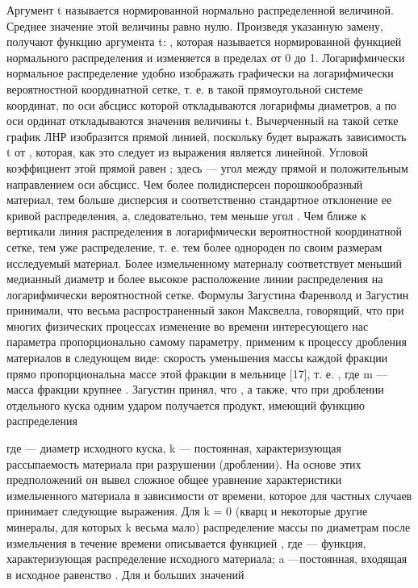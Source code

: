 Аргумент t называется нормированной нормально распределенной величиной. Среднее значение этой величины равно нулю. 
Произведя указанную замену, получают функцию аргумента t:
 ,
 которая называется нормированной функцией нормального распределения и изменяется в пределах от 0 до 1.
Логарифмически нормальное распределение удобно изображать графически на логарифмически вероятностной координатной сетке, т. е. в такой прямоугольной системе координат, по оси абсцисс которой откладываются логарифмы диаметров, а по оси ординат откладываются значения величины t. 
Вычерченный на такой сетке график ЛНР изобразится прямой линией, поскольку будет выражать зависимость t от  , которая, как это следует из выражения является линейной. 
Угловой коэффициент  этой прямой равен  ; здесь   — угол между прямой и положительным направлением оси абсцисс. 
Чем более полидисперсен порошкообразный материал, тем больше дисперсия и соответственно стандартное отклонение   ее кривой распределения, а, следовательно, тем меньше угол  . Чем ближе к вертикали линия распределения в логарифмически вероятностной координатной сетке, тем уже распределение, т. е. тем более однороден по своим размерам исследуемый материал. 
Более измельченному материалу соответствует меньший медианный диаметр   и более высокое расположение линии распределения на логарифмически вероятностной сетке. 
Формулы Загустина 
Фаренволд и Загустин принимали, что весьма распространенный закон Максвелла, говорящий, что при многих физических процессах изменение во времени интересующего нас параметра пропорционально самому параметру, применим к процессу дробления материалов в следующем виде: скорость уменьшения массы каждой фракции прямо пропорциональна массе этой фракции в мельнице [17], т. е. 
 ,
где m — масса фракции крупнее  . 
Загустин принял, что  , а также, что при дроблении отдельного куска одним ударом получается продукт, имеющий функцию распределения 
 
где  — диаметр исходного куска, k — постоянная, характеризующая рассыпаемость материала при разрушении (дроблении). 
На основе этих предположений он вывел сложное общее уравнение характеристики измельченного материала в зависимости от времени, которое для частных случаев принимает следующие выражения. 
Для k = 0 (кварц и некоторые другие минералы, для которых k весьма мало) распределение массы по диаметрам после измельчения в течение времени   описывается функцией 
 ,
где  — функция, характеризующая распределение исходного материала; a —постоянная, входящая в исходное равенство  .
Для   и больших значений   
 
